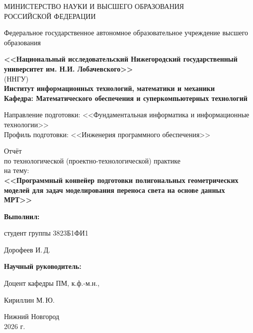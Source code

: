 \begin{titlepage}
	\begin{center}
		\large
		{МИНИСТЕРСТВО НАУКИ И ВЫСШЕГО ОБРАЗОВАНИЯ\\ РОССИЙСКОЙ ФЕДЕРАЦИИ}
		
		Федеральное государственное автономное образовательное учреждение высшего образования
		\vspace{0.5cm}
		
		\textbf{<<Национальный исследовательский Нижегородский государственный университет им. Н.И. Лобачевского>>}\\
		(ННГУ)\\
		\vspace{1cm}
		\textbf{Институт информационных технологий, математики и механики}\\
		\vspace{0.5cm}
		\textbf{Кафедра: Ма­те­ма­ти­че­ско­го обес­пе­че­ния и су­пер­ком­пью­тер­ных тех­но­ло­гий}
		\vspace{1cm}
		
		Направление подготовки: <<Фундаментальная информатика и информационные технологии>>\\
		Профиль подготовки: <<Инженерия программного обеспечения>>
		\vfill
		
		\vfill
		
		\Large
		Отчёт \\
		\normalsize
        по технологической (проектно-технологической) практике \\
		на тему:\\
		\Large
		\textbf{<<Программный конвейер подготовки полигональных геометрических моделей для задач моделирования переноса света на основе данных МРТ>>}
		{\LARGE 
		}
		\bigskip
		
		
	\end{center}
	\vfill
	
	\hfill\begin{minipage}{0.4\textwidth}
		\textbf{Выполнил:} 

            студент группы 3823Б1ФИ1 

            \underline{\hspace{3cm}} Дорофеев И.\,Д. \bigskip

	\end{minipage}%
	
	\hfill\begin{minipage}{0.4\textwidth}
		\textbf{Научный руководитель:}
  
		Доцент кафедры ПМ, к.ф.-м.н.,
        
		\underline{\hspace{3cm}}  Кириллин М.\,Ю.

	\end{minipage}
	\vfill
	
	\begin{center}
		Нижний Новгород\\
		2026 г.
	\end{center}
\end{titlepage}
\thispagestyle{empty} %